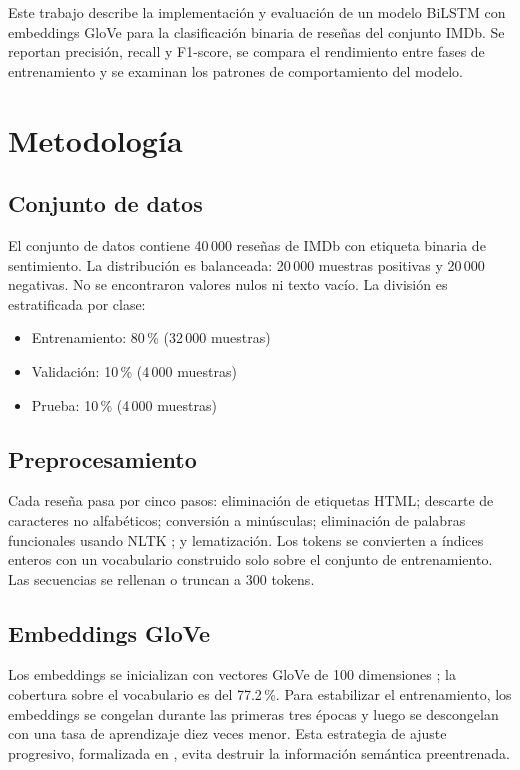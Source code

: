 \documentclass[letterpaper, 10pt, conference]{ieeeconf}
\begin{document}
Este trabajo describe la implementaci\'on y evaluaci\'on de un modelo BiLSTM
con embeddings GloVe para la clasificaci\'on binaria de rese\~nas del conjunto
IMDb. Se reportan precisi\'on, recall y F1-score, se compara el rendimiento
entre fases de entrenamiento y se examinan los patrones de comportamiento del
modelo.

\section{Metodolog\'ia}

\subsection{Conjunto de datos}

El conjunto de datos contiene 40\,000 rese\~nas de IMDb \cite{maas2011} con
etiqueta binaria de sentimiento. La distribuci\'on es balanceada: 20\,000
muestras positivas y 20\,000 negativas. No se encontraron valores nulos ni
texto vac\'io. La divisi\'on es estratificada por clase:

\begin{itemize}
  \item Entrenamiento: 80\,\% (32\,000 muestras)
  \item Validaci\'on: 10\,\% (4\,000 muestras)
  \item Prueba: 10\,\% (4\,000 muestras)
\end{itemize}

\subsection{Preprocesamiento}

Cada rese\~na pasa por cinco pasos: eliminaci\'on de etiquetas HTML; descarte
de caracteres no alfab\'eticos; conversi\'on a min\'usculas; eliminaci\'on de
palabras funcionales usando NLTK \cite{bird2009}; y lematizaci\'on. Los tokens
se convierten a \'indices enteros con un vocabulario construido solo sobre el
conjunto de entrenamiento. Las secuencias se rellenan o truncan a 300 tokens.

\subsection{Embeddings GloVe}

Los embeddings se inicializan con vectores GloVe de 100 dimensiones
\cite{pennington2014}; la cobertura sobre el vocabulario es del 77.2\,\%.
Para estabilizar el entrenamiento, los embeddings se congelan durante las
primeras tres \'epocas y luego se descongelan con una tasa de aprendizaje
diez veces menor. Esta estrategia de ajuste progresivo, formalizada en
\cite{howard2018}, evita destruir la informaci\'on sem\'antica preentrenada.
\end{document}
